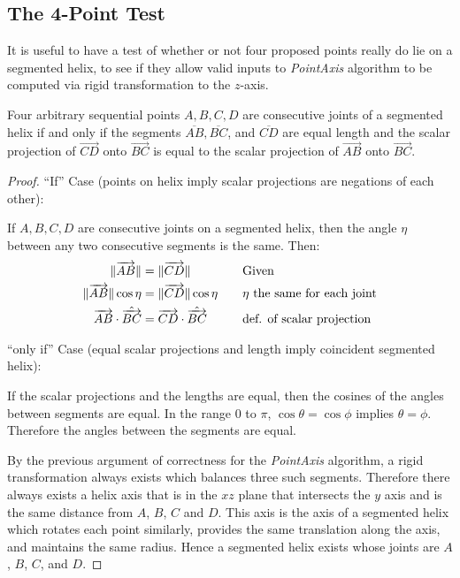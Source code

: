 \documentclass[mathematics,article,submit,pdftex,moreauthors]{Definitions/mdpi}
\DeclarePairedDelimiter{\norm}{\lVert}{\rVert}
\begin{document}
\subsection{The 4-Point Test}

It is useful to have a test of whether or not four proposed points really do lie on a segmented helix, to see
if they allow valid inputs to {\em PointAxis} algorithm to be computed via rigid
transformation to the $z$-axis.

\begin{Theorem}
  Four arbitrary sequential points $A,B,C,D$ are consecutive joints of a segmented helix if and only if
  the segments $\overline{AB},\overline{BC}$, and $\overline{CD}$ are equal length and the scalar projection
  of $\overrightarrow{CD}$ onto $\overrightarrow{BC}$ is equal to the scalar projection of $\overrightarrow{AB}$
  onto $\overrightarrow{BC}$.
\end{Theorem}

\begin{proof}
  ``If'' Case (points on helix imply scalar projections are negations of each other):

  If $A,B,C,D$ are consecutive joints on a segmented helix, then the angle $\eta$ between any two consecutive segments is the
  same. Then:
  \begin{alignat*}{2}
    \norm{\overrightarrow{AB}} &= \norm{\overrightarrow{CD}} &\quad &\text{Given}\\
    \norm{\overrightarrow{AB}}\cos{\eta} &= \norm{\overrightarrow{CD}}\cos{\eta} &\quad &\text{$\eta$ the same for each joint} \\
    \overrightarrow{AB} \cdot \hat{\overrightarrow{BC}} &= \overrightarrow{CD} \cdot \hat{\overrightarrow{BC}} &\quad &\text{def. of scalar projection} \\
  \end{alignat*}

  ``only if'' Case (equal scalar projections and length imply coincident segmented helix):

  If the scalar projections and the lengths are equal, then the cosines of the angles between segments are equal.
  In the range $0$ to $\pi$,
  $\cos{\theta} = \cos{\phi}$ implies $\theta = \phi$. Therefore the angles between the segments are equal.

  By the previous argument of correctness for the {\em PointAxis} algorithm, a rigid transformation always exists
  which balances three such segments. Therefore there always exists a helix axis that
  is in the $xz$ plane that intersects the $y$ axis and is the same distance from $A$, $B$, $C$ and $D$.
  This axis is the axis of a segmented helix which rotates each point similarly, provides the same translation along the axis,
  and maintains the same radius. Hence a segmented helix exists whose joints are $A$, $B$, $C$, and $D$.
\end{proof}
\end{document}
